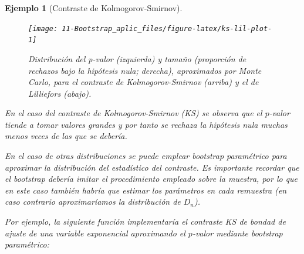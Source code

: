 \documentclass[
  10pt,
]{book}
\theoremstyle{break}
\newtheorem{example}{Ejemplo}[chapter]
\theoremstyle{nonumberplain}
\begin{document}
\begin{example}[Contraste de Kolmogorov-Smirnov]
\begin{figure}[!htbp]

{\centering \texttt{[image: 11-Bootstrap\_aplic\_files/figure-latex/ks-lil-plot-1]} 

}

\caption{Distribución del p-valor (izquierda) y tamaño (proporción de rechazos bajo la hipótesis nula; derecha), aproximados por Monte Carlo, para el contraste de Kolmogorov-Smirnov (arriba) y el de Lilliefors (abajo).}\label{fig:ks-lil-plot}
\end{figure}

En el caso del contraste de Kolmogorov-Smirnov (KS) se observa que el \(p\)-valor
tiende a tomar valores grandes y por tanto se rechaza la hipótesis nula
muchas menos veces de las que se debería.

En el caso de otras distribuciones se puede emplear bootstrap paramétrico para
aproximar la distribución del estadístico del contraste.
Es importante recordar que el bootstrap debería imitar el procedimiento
empleado sobre la muestra, por lo que en este caso también habría que estimar
los parámetros en cada remuestra
(en caso contrario aproximaríamos la distribución de \(D_n\)).

Por ejemplo, la siguiente función implementaría el contraste KS de
bondad de ajuste de una variable exponencial aproximando el
\(p\)-valor mediante bootstrap paramétrico:


\end{example}
\end{document}
